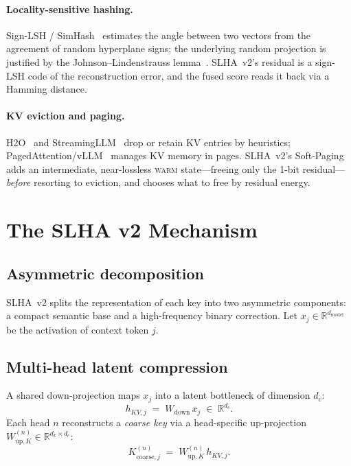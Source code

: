 \documentclass[11pt]{article}
\theoremstyle{plain}
\theoremstyle{definition}
\newcommand{\dc}{d_c}
\newcommand{\dk}{d_k}
\begin{document}
\paragraph{Locality-sensitive hashing.}
Sign-LSH / SimHash~\cite{charikar} estimates the angle between two
vectors from the agreement of random hyperplane signs; the underlying
random projection is justified by the Johnson--Lindenstrauss
lemma~\cite{jl}. SLHA~v2's residual is a sign-LSH code of the
reconstruction error, and the fused score reads it back via a Hamming
distance.

\paragraph{KV eviction and paging.}
H2O~\cite{h2o} and StreamingLLM~\cite{streamingllm} drop or retain KV
entries by heuristics; PagedAttention/vLLM~\cite{vllm} manages KV memory
in pages. SLHA~v2's Soft-Paging adds an intermediate, near-lossless
\textsc{warm} state---freeing only the 1-bit residual---\emph{before}
resorting to eviction, and chooses what to free by residual energy.

\section{The SLHA v2 Mechanism}
\label{sec:method}

\subsection{Asymmetric decomposition}
SLHA~v2 splits the representation of each key into two asymmetric
components: a compact semantic base and a high-frequency binary
correction. Let $x_j \in \mathbb{R}^{d_{\text{model}}}$ be the
activation of context token $j$.

\subsection{Multi-head latent compression}
A shared down-projection maps $x_j$ into a latent bottleneck of
dimension $\dc$:
\begin{equation}
  h_{KV,j} \;=\; W_{\text{down}}\, x_j \;\in\; \mathbb{R}^{\dc}.
\end{equation}
Each head $n$ reconstructs a \emph{coarse key} via a head-specific
up-projection $W_{\text{up},K}^{(n)} \in \mathbb{R}^{\dk \times \dc}$:
\begin{equation}
  K_{\text{coarse},j}^{(n)} \;=\; W_{\text{up},K}^{(n)}\, h_{KV,j}.
\end{equation}
\end{document}
